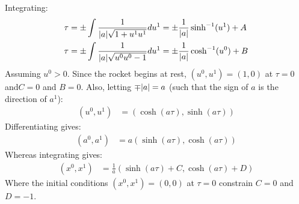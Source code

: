 \documentclass[a4paper]{article}
\begin{document}
Integrating:
\begin{align*}
\tau &= \pm \int \frac{1}{\abs{a}\sqrt{1 + u^1 u^1}} du^1 = \pm \frac{1}{\abs{a}}\sinh^{-1}(u^1) + A\\
\tau &= \pm \int \frac{1}{\abs{a}\sqrt{u^0 u^0 - 1}} du^1 = \pm \frac{1}{\abs{a}}\cosh^{-1}(u^0) + B
\end{align*}
Assuming $u^0 > 0$. Since the rocket begins at rest, $(u^0, u^1) = (1, 0)$ at $\tau = 0$ and$C = 0$ and $B = 0$. Also, letting $\mp \abs{a} = a$ (such that the sign of $a$ is the direction of $a^1$):
\begin{align*}
(u^0, u^1) &= (\cosh(a \tau), \sinh(a\tau))
\end{align*}
Differentiating gives:
\begin{align*}
	(a^0, a^1) &= a(\sinh(a \tau), \cosh(a\tau))
\end{align*}
Whereas integrating gives:
\begin{align*}
	(x^0, x^1) &= \frac{1}{a}(\sinh(a \tau) + C, \cosh(a\tau) + D)
\end{align*}
Where the initial conditions $(x^0, x^1) = (0, 0)$ at $\tau = 0$ constrain $C = 0$ and $D = -1$.
%         
%         

% 
\end{document}
